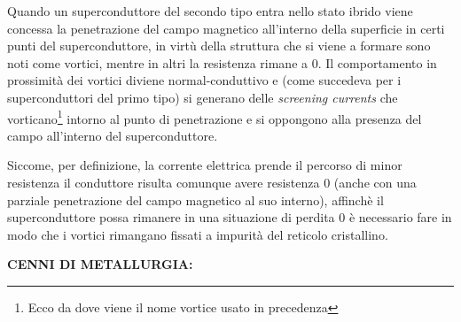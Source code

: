 \documentclass[a4paper,10pt]{article}
\begin{document}
Quando un superconduttore del secondo tipo entra nello stato ibrido viene concessa la penetrazione del campo magnetico all'interno della superficie in certi punti del superconduttore, in virtù della struttura che si viene a formare sono noti come vortici, mentre in altri la resistenza rimane a $0$. Il comportamento in prossimità dei vortici diviene normal-conduttivo e (come succedeva per i superconduttori del primo tipo) si generano delle \emph{screening currents} che vorticano\footnote{Ecco da dove viene il nome vortice usato in precedenza} intorno al punto di penetrazione e si oppongono alla presenza del campo all'interno del superconduttore.

Siccome, per definizione, la corrente elettrica prende il percorso di minor resistenza il conduttore risulta comunque avere resistenza $0$ (anche con una parziale penetrazione del campo magnetico al suo interno), affinchè il superconduttore possa rimanere in una situazione di perdita $0$ è necessario fare in modo che i vortici rimangano fissati a impurità del reticolo cristallino.

\bigskip
{}
\label{sec:metallurgy}
\noindent
\textbf{CENNI DI METALLURGIA:}

\clearpage

\printbibliography
\end{document}
